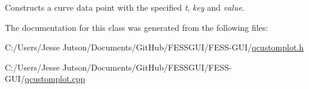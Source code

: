 Constructs a curve data point with the specified {\itshape t}, {\itshape key} and {\itshape value}. 

The documentation for this class was generated from the following files\+:\begin{DoxyCompactItemize}
\item 
C\+:/\+Users/\+Jesse Jutson/\+Documents/\+Git\+Hub/\+F\+E\+S\+S\+G\+U\+I/\+F\+E\+S\+S-\/\+G\+U\+I/\hyperlink{qcustomplot_8h}{qcustomplot.\+h}\item 
C\+:/\+Users/\+Jesse Jutson/\+Documents/\+Git\+Hub/\+F\+E\+S\+S\+G\+U\+I/\+F\+E\+S\+S-\/\+G\+U\+I/\hyperlink{qcustomplot_8cpp}{qcustomplot.\+cpp}\end{DoxyCompactItemize}
